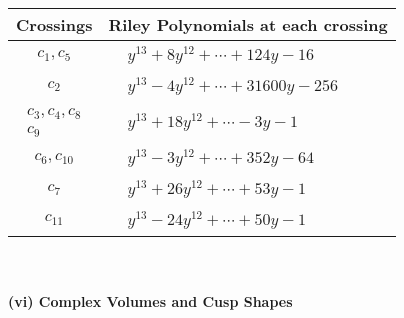 \documentclass[1p]{elsarticle_modified}
\theoremstyle{definition}
\begin{document}
\begin{tabular}{m{50pt}|m{274pt}}
Crossings & \hspace{64pt}Riley Polynomials at each crossing \\
\hline $$\begin{aligned}c_{1},c_{5}\end{aligned}$$&$\begin{aligned}
&y^{13}+8 y^{12}+\cdots+124 y-16
\end{aligned}$\\
\hline $$\begin{aligned}c_{2}\end{aligned}$$&$\begin{aligned}
&y^{13}-4 y^{12}+\cdots+31600 y-256
\end{aligned}$\\
\hline $$\begin{aligned}c_{3},c_{4},c_{8}\\c_{9}\end{aligned}$$&$\begin{aligned}
&y^{13}+18 y^{12}+\cdots-3 y-1
\end{aligned}$\\
\hline $$\begin{aligned}c_{6},c_{10}\end{aligned}$$&$\begin{aligned}
&y^{13}-3 y^{12}+\cdots+352 y-64
\end{aligned}$\\
\hline $$\begin{aligned}c_{7}\end{aligned}$$&$\begin{aligned}
&y^{13}+26 y^{12}+\cdots+53 y-1
\end{aligned}$\\
\hline $$\begin{aligned}c_{11}\end{aligned}$$&$\begin{aligned}
&y^{13}-24 y^{12}+\cdots+50 y-1
\end{aligned}$\\
\hline
\end{tabular}\\~\\
\newpage\flushleft \textbf{(vi) Complex Volumes and Cusp Shapes}
\end{document}
